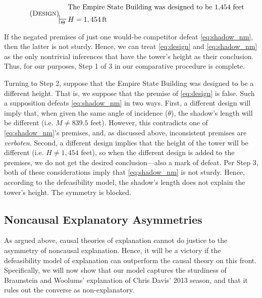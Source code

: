 \documentclass[natbib]{svjour3}                     %
\begin{document}
\begin{equation}
\label{eq:design}\tag{\textsc{Design}}
	\begin{split}
	& \text{The Empire State Building was designed to be 1,454 feet } \\
	\sststile{\Theta}{} \, & H = 1,454\,\text{ft}
	\end{split}
\end{equation}



\noindent If the negated premises of just one would-be competitor defeat \ref{eq:shadow_nm}, then the latter is not sturdy. Hence, we can treat \ref{eq:design} and \ref{eq:shadow_nm} as the only nontrivial inferences that have the tower's height as their conclusion. Thus, for our purposes, Step 1 of 3 in our comparative procedure is complete. 

Turning to Step 2, suppose that the Empire State Building was designed to be a different height.  That is, we suppose that the premise of \ref{eq:design} is false. Such a supposition defeats \ref{eq:shadow_nm} in two ways. First, a different design will imply that, when given the same angle of incidence ($\theta$), the shadow's length will be different (i.e. $M \neq 839.5$ feet). However, this contradicts one of \ref{eq:shadow_nm}'s premises, and, as discussed above, inconsistent premises are \textit{verboten}. Second, a different design implies that the height of the tower will be different (i.e. $H \neq 1,454$ feet), so when the different design is added to the premises, we do not get the desired conclusion---also a mark of defeat. Per Step 3, both of these considerations imply that \ref{eq:shadow_nm} is not sturdy. Hence, according to the defeasibility model, the shadow's length does not explain the tower's height. The symmetry is blocked.

\subsection{Noncausal Explanatory Asymmetries}
\label{subsec:noncausal_symm}
As argued above, causal theories of explanation cannot do justice to the asymmetry of noncausal explanation. Hence, it will be a victory if the defeasibility model of explanation can outperform the causal theory on this front. Specifically, we will now show that our model captures the sturdiness of Braunstein and Woolums' explanation of Chris Davis' 2013 season, and that it rules out the converse as non-explanatory.
\end{document}

